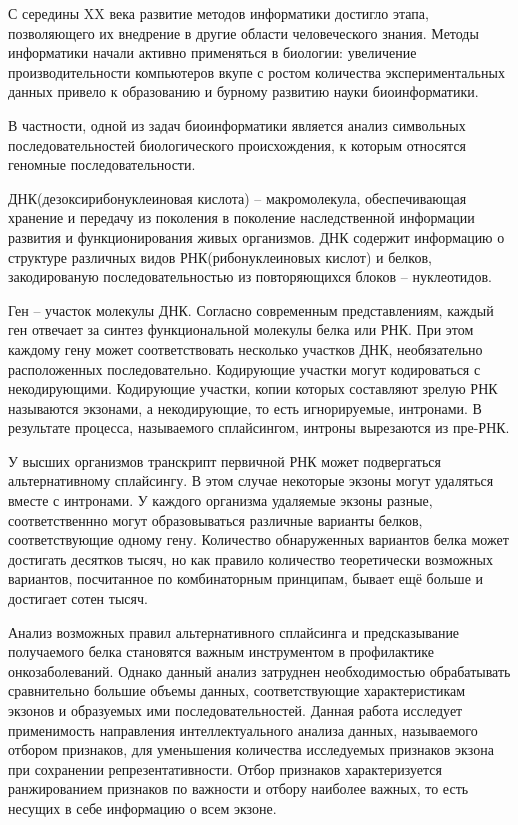 С середины XX века развитие методов информатики достигло этапа, позволяющего их внедрение в другие области человеческого знания. Методы
информатики начали активно применяться в биологии: увеличение производительности компьютеров вкупе с ростом количества экспериментальных
данных привело к образованию и бурному развитию науки биоинформатики\cite{durbin1998biological}.

В частности, одной из задач биоинформатики является анализ символьных последовательностей биологического происхождения, к которым относятся геномные последовательности\cite{oyelade2016clustering}.

ДНК(дезоксирибонуклеиновая кислота) – макромолекула, обеспечивающая хранение и передачу из поколения в поколение наследственной информации развития и функционирования живых организмов. ДНК содержит информацию о структуре различных видов РНК(рибонуклеиновых кислот) и белков, закодированую последовательностью из повторяющихся блоков – нуклеотидов\cite{sakharkar2004distributions}.

Ген -- участок молекулы ДНК. Согласно современным представлениям, каждый ген отвечает за синтез функциональной молекулы белка или РНК. При этом каждому гену может соответствовать несколько участков ДНК, необязательно расположенных последовательно. Кодирующие участки могут кодироваться с некодирующими. Кодирующие участки, копии которых составляют зрелую РНК называются экзонами, а некодирующие, то есть игнорируемые, интронами. В результате процесса, называемого сплайсингом, интроны вырезаются из пре-РНК\cite{grinev2015decoding}.

У высших организмов транскрипт первичной РНК может подвергаться альтернативному сплайсингу. В этом случае некоторые экзоны могут удаляться вместе с интронами. У каждого организма удаляемые экзоны разные, соответственнно могут образовываться различные варианты белков, соответствующие одному гену. Количество обнаруженных вариантов белка может достигать десятков тысяч, но как правило количество теоретически возможных вариантов, посчитанное по комбинаторным принципам, бывает ещё больше и достигает сотен тысяч. 

Анализ возможных правил альтернативного сплайсинга и предсказывание получаемого белка становятся важным инструментом в профилактике онкозаболеваний. Однако данный анализ затруднен необходимостью обрабатывать сравнительно большие объемы данных, соответствующие характеристикам экзонов и образуемых ими последовательностей. Данная работа исследует применимость направления интеллектуального анализа данных, называемого отбором признаков, для уменьшения количества исследуемых признаков экзона при сохранении репрезентативности. Отбор признаков характеризуется ранжированием признаков по важности и отбору наиболее важных, то есть несущих в себе информацию о всем экзоне.

